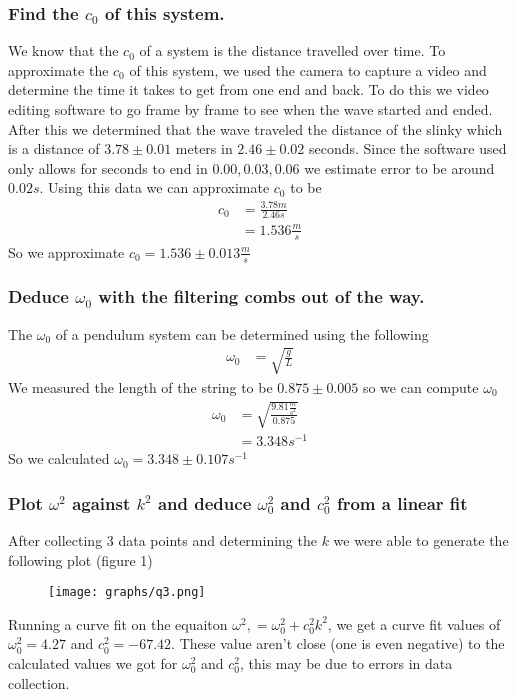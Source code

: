 \documentclass{article}
\begin{document}
\subsubsection*{Find the $c_0$ of this system.}
We know that the $c_0$ of a system is the distance travelled over time. To
approximate the $c_0$ of this system, we used the camera to capture a video
and determine the time it takes to get from one end and back. To do this we
video editing software to go frame by frame to see when the wave started and
ended. After this we determined that the wave traveled the distance of the
slinky which is a distance of $3.78 \pm 0.01$ meters in $2.46 \pm 0.02$ seconds.
Since the software used only allows for seconds to end in $0.00,0.03, 0.06$ we
estimate error to be around $0.02s$. Using this data we can approximate $c_0$
to be
\begin{align*}
    c_0 &= \frac{3.78m}{2.46s}\\
    &= 1.536 \frac{m}{s}
\end{align*}
So we approximate $c_0 = 1.536 \pm 0.013 \frac{m}{s}$
\newpage

\subsubsection*{Deduce $\omega_0$ with the filtering combs out of the way.}
The $\omega_0$ of a pendulum system can be determined using the following
\begin{align*}
    \omega_0 &= \sqrt{\frac{g}{L}}
\end{align*}
We measured the length of the string to be $0.875 \pm 0.005$ so we can compute
$\omega_0$
\begin{align*}
    \omega_0 &= \sqrt{\frac{9.81\frac{m}{s^2}}{0.875}}\\
    &= 3.348 s^{-1}
\end{align*}
So we calculated $\omega_0 = 3.348 \pm 0.107 s^{-1}$ 

\subsubsection*{Plot $\omega^2$ against $k^2$ and deduce $\omega_0^2$ and $c^2_0$
from a linear fit}
After collecting 3 data points and determining the $k$ we were able to generate
the following plot (figure 1)\\
\begin{figure}[hp!]
    \centering
    \texttt{[image: graphs/q3.png]}
    \caption{}
\end{figure}
Running a curve fit on the equaiton $\omega^2, = \omega_0^2 + c_0^2k^2$, we get
a curve fit values of $\omega_0^2 = 4.27$ and $c_0^2 = -67.42$. These value
aren't close (one is even negative)
to the calculated values we got for $\omega_0^2$ and $c_0^2$, this may be due
to errors in data collection.
\newpage
\end{document}
